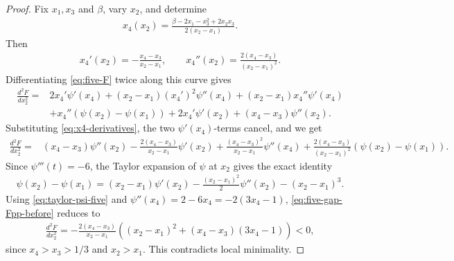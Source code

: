 \documentclass[10pt,a4paper]{article}
\begin{document}
\begin{proof}
Fix $x_1,x_3$ and $\beta$, vary $x_2$, and determine
\begin{align}\label{eq:x4-function}
  x_4(x_2)=\frac{\beta-2x_1-x_3^2+2x_2x_3}{2(x_2-x_1)}.
\end{align}
Then
\begin{align}\label{eq:x4-derivatives}
  x_4'(x_2)=-\frac{x_4-x_3}{x_2-x_1},
  \qquad
  x_4''(x_2)=\frac{2(x_4-x_3)}{(x_2-x_1)^2}.
\end{align}
Differentiating \eqref{eq:five-F} twice along this curve gives
\begin{align*}
\frac{d^2F}{dx_2^2}={}&2x_4'\psi'(x_4)+(x_2-x_1)(x_4')^2\psi''(x_4)+(x_2-x_1)x_4''\psi'(x_4)\\
&+x_4''(\psi(x_2)-\psi(x_1))+2x_4'\psi'(x_2)+(x_4-x_3)\psi''(x_2).
\end{align*}
Substituting \eqref{eq:x4-derivatives}, the two $\psi'(x_4)$-terms cancel, and we get
\begin{align}\label{eq:five-gap-Fpp-before}
\frac{d^2F}{dx_2^2}={}&(x_4-x_3)\psi''(x_2)-\frac{2(x_4-x_3)}{x_2-x_1}\psi'(x_2)+\frac{(x_4-x_3)^2}{x_2-x_1}\psi''(x_4)
+\frac{2(x_4-x_3)}{(x_2-x_1)^2}(\psi(x_2)-\psi(x_1)).
\end{align}
Since $\psi'''(t)=-6$, the Taylor expansion of $\psi$ at $x_2$ gives the exact identity
\begin{align}\label{eq:taylor-psi-five}
  \psi(x_2)-\psi(x_1)=(x_2-x_1)\psi'(x_2)-\frac{(x_2-x_1)^2}{2}\psi''(x_2)-(x_2-x_1)^3.
\end{align}
Using \eqref{eq:taylor-psi-five} and $\psi''(x_4)=2-6x_4=-2(3x_4-1)$,  \eqref{eq:five-gap-Fpp-before} reduces to
\begin{align}\label{eq:five-second-final}
  \frac{d^2F}{dx_2^2}
  =-\frac{2(x_4-x_3)}{x_2-x_1}\left((x_2-x_1)^2+(x_4-x_3)(3x_4-1)\right)<0,
\end{align}
since $x_4>x_3>1/3$ and $x_2>x_1$.  This contradicts local minimality.


\end{proof}
\end{document}
